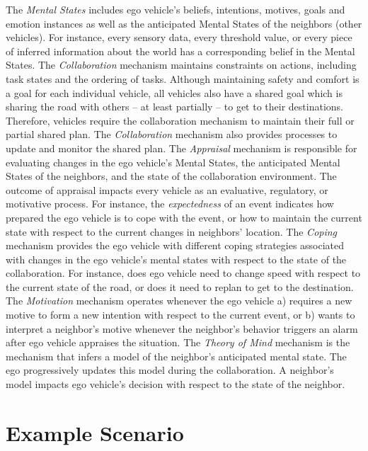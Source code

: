 \documentclass[journal, 11pt]{IEEEtran}
\begin{document}
The \textit{Mental States} includes ego vehicle's beliefs, intentions,
motives, goals and emotion instances as well as the anticipated Mental States of
the neighbors (other vehicles). For instance, every sensory data, every
threshold value, or every piece of inferred information about the world has a
corresponding belief in the Mental States. The \textit{Collaboration} mechanism
maintains constraints on actions, including task states and the ordering of
tasks. Although maintaining safety and comfort is a goal for each individual
vehicle, all vehicles also have a shared goal which is sharing the road with
others -- at least partially -- to get to their destinations. Therefore,
vehicles require the collaboration mechanism to maintain their full or partial
shared plan. The \textit{Collaboration} mechanism also provides processes to
update and monitor the shared plan. The \textit{Appraisal} mechanism is
responsible for evaluating changes in the ego vehicle's Mental States, the
anticipated Mental States of the neighbors, and the state of the collaboration
environment. The outcome of appraisal impacts every vehicle as an evaluative,
regulatory, or motivative process. For instance, the \textit{expectedness} of an
event indicates how prepared the ego vehicle is to cope with the event, or how
to maintain the current state with respect to the current changes in neighbors'
location. The \textit{Coping} mechanism provides the ego vehicle with different
coping strategies associated with changes in the ego vehicle's mental states with
respect to the state of the collaboration. For instance, does ego vehicle need
to change speed with respect to the current state of the road, or does it need
to replan to get to the destination. The \textit{Motivation} mechanism operates
whenever the ego vehicle a) requires a new motive to form a new intention with
respect to the current event, or b) wants to interpret a neighbor's motive
whenever the neighbor's behavior triggers an alarm after ego vehicle appraises
the situation. The \textit{Theory of Mind} mechanism is the mechanism that
infers a model of the neighbor's anticipated mental state. The ego progressively
updates this model during the collaboration. A neighbor's model impacts ego
vehicle's decision with respect to the state of the neighbor.

\section{Example Scenario}
\label{sec:example-scenario}
\end{document}

